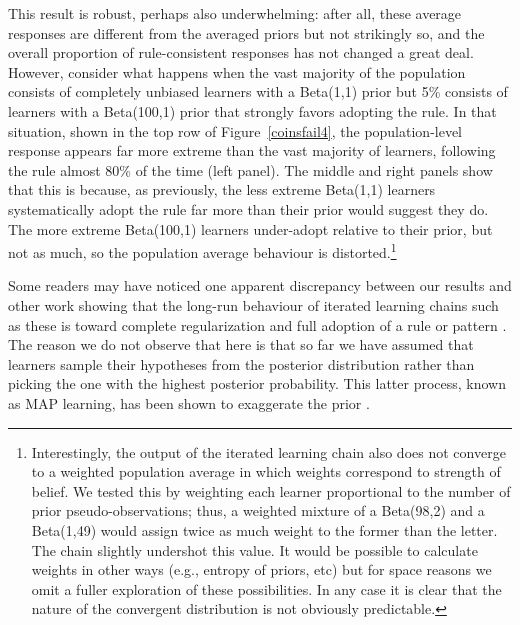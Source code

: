 \documentclass[doc]{apa6}
\begin{document}
This result is robust, perhaps also underwhelming: after all, these average responses are different from the averaged priors but not strikingly so, and the overall proportion of rule-consistent responses has not changed a great deal. However, consider what happens when the vast majority of the population consists of completely unbiased learners with a Beta(1,1) prior but 5\% consists of learners with a Beta(100,1) prior that strongly favors adopting the rule. In that situation, shown in the top row of Figure~\ref{coinsfail4}, the population-level response appears far more extreme than the vast majority of learners, following the rule almost 80\% of the time (left panel). The middle and right panels show that this is because, as previously, the less extreme Beta(1,1) learners systematically adopt the rule far more than their prior would suggest they do. The more extreme Beta(100,1) learners under-adopt relative to their prior, but not as much, so the population average behaviour is distorted.\footnote{Interestingly, the output of the iterated learning chain also does not converge to a weighted population average in which weights correspond to strength of belief. We tested this by weighting each learner proportional to the number of prior pseudo-observations; thus, a weighted mixture of a Beta(98,2) and a Beta(1,49) would assign twice as much weight to the former than the letter. The chain slightly undershot this value. It would be possible to calculate weights in other ways (e.g., entropy of priors, etc) but for space reasons we omit a fuller exploration of these possibilities. In any case it is clear that the nature of the convergent distribution is not obviously predictable.}

Some readers may have noticed one apparent discrepancy between our results and other work showing that the long-run behaviour of iterated learning chains such as these is toward complete regularization and full adoption of a rule or pattern \parencite{realigriffiths09,smithwonnacott10}. The reason we do not observe that here is that so far we have assumed that learners sample their hypotheses from the posterior distribution rather than picking the one with the highest posterior probability. This latter process, known as MAP learning, has been shown to exaggerate the prior \parencite{kirbyetal07}.
\end{document}
